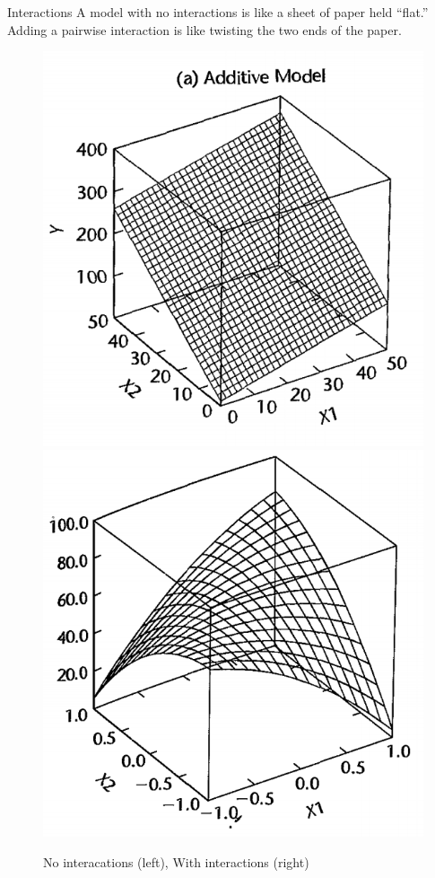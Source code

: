 \documentclass{beamer}
\begin{document}
\begin{frame}{Interactions}
A model with no interactions is like a sheet of paper held ``flat.'' Adding a pairwise interaction is like twisting the two ends of the paper.
\begin{figure}
    \includegraphics[height=.5\textheight]{plots/additive.png}\quad\includegraphics[height=.5\textheight]{plots/interactions.png}
    \caption{No interacations (left), With interactions (right)}
\end{figure}
\end{frame}
\end{document}

